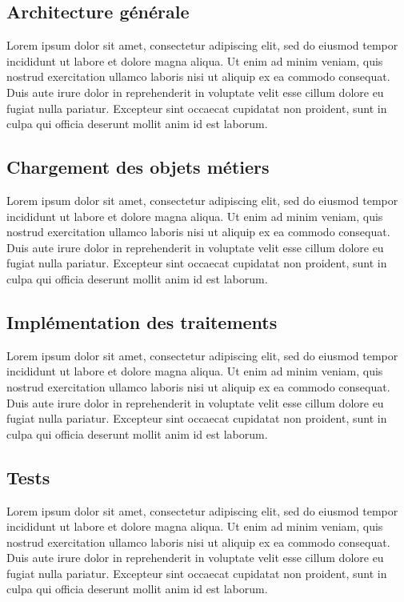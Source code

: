 \documentclass[a4paper, 12pt]{report}
\begin{document}
\subsection{Architecture générale}

Lorem ipsum dolor sit amet, consectetur adipiscing elit, sed do eiusmod tempor incididunt ut labore et dolore magna aliqua. Ut enim ad minim veniam, quis nostrud exercitation ullamco laboris nisi ut aliquip ex ea commodo consequat. Duis aute irure dolor in reprehenderit in voluptate velit esse cillum dolore eu fugiat nulla pariatur. Excepteur sint occaecat cupidatat non proident, sunt in culpa qui officia deserunt mollit anim id est laborum.

\subsection{Chargement des objets métiers}

Lorem ipsum dolor sit amet, consectetur adipiscing elit, sed do eiusmod tempor incididunt ut labore et dolore magna aliqua. Ut enim ad minim veniam, quis nostrud exercitation ullamco laboris nisi ut aliquip ex ea commodo consequat. Duis aute irure dolor in reprehenderit in voluptate velit esse cillum dolore eu fugiat nulla pariatur. Excepteur sint occaecat cupidatat non proident, sunt in culpa qui officia deserunt mollit anim id est laborum.

\subsection{Implémentation des traitements}

Lorem ipsum dolor sit amet, consectetur adipiscing elit, sed do eiusmod tempor incididunt ut labore et dolore magna aliqua. Ut enim ad minim veniam, quis nostrud exercitation ullamco laboris nisi ut aliquip ex ea commodo consequat. Duis aute irure dolor in reprehenderit in voluptate velit esse cillum dolore eu fugiat nulla pariatur. Excepteur sint occaecat cupidatat non proident, sunt in culpa qui officia deserunt mollit anim id est laborum.

\subsection{Tests}

Lorem ipsum dolor sit amet, consectetur adipiscing elit, sed do eiusmod tempor incididunt ut labore et dolore magna aliqua. Ut enim ad minim veniam, quis nostrud exercitation ullamco laboris nisi ut aliquip ex ea commodo consequat. Duis aute irure dolor in reprehenderit in voluptate velit esse cillum dolore eu fugiat nulla pariatur. Excepteur sint occaecat cupidatat non proident, sunt in culpa qui officia deserunt mollit anim id est laborum.
\end{document}
